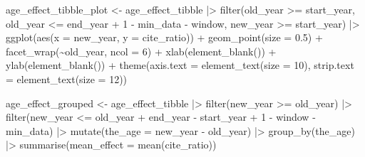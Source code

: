 \documentclass[
  10pt,
  letterpaper,
  DIV=11,
  numbers=noendperiod,
  twoside]{scrartcl}
\newenvironment{Shaded}{\begin{snugshade}}{\end{snugshade}}
\newcommand{\AttributeTok}[1]{\textcolor[rgb]{0.40,0.45,0.13}{#1}}
\newcommand{\DecValTok}[1]{\textcolor[rgb]{0.68,0.00,0.00}{#1}}
\newcommand{\FloatTok}[1]{\textcolor[rgb]{0.68,0.00,0.00}{#1}}
\newcommand{\FunctionTok}[1]{\textcolor[rgb]{0.28,0.35,0.67}{#1}}
\newcommand{\NormalTok}[1]{\textcolor[rgb]{0.00,0.23,0.31}{#1}}
\newcommand{\OtherTok}[1]{\textcolor[rgb]{0.00,0.23,0.31}{#1}}
\newcommand{\SpecialCharTok}[1]{\textcolor[rgb]{0.37,0.37,0.37}{#1}}
\begin{document}
\begin{Shaded}
\begin{Highlighting}[]
\NormalTok{age\_effect\_tibble\_plot }\OtherTok{\textless{}{-}}\NormalTok{ age\_effect\_tibble }\SpecialCharTok{|\textgreater{}}
  \FunctionTok{filter}\NormalTok{(old\_year }\SpecialCharTok{\textgreater{}=}\NormalTok{ start\_year, old\_year }\SpecialCharTok{\textless{}=}\NormalTok{ end\_year }\SpecialCharTok{+} \DecValTok{1} \SpecialCharTok{{-}}\NormalTok{ min\_data }\SpecialCharTok{{-}}\NormalTok{ window, new\_year }\SpecialCharTok{\textgreater{}=}\NormalTok{ start\_year) }\SpecialCharTok{|\textgreater{}}
  \FunctionTok{ggplot}\NormalTok{(}\FunctionTok{aes}\NormalTok{(}\AttributeTok{x =}\NormalTok{ new\_year, }\AttributeTok{y =}\NormalTok{ cite\_ratio)) }\SpecialCharTok{+}
  \FunctionTok{geom\_point}\NormalTok{(}\AttributeTok{size =} \FloatTok{0.5}\NormalTok{) }\SpecialCharTok{+}
  \FunctionTok{facet\_wrap}\NormalTok{(}\SpecialCharTok{\textasciitilde{}}\NormalTok{old\_year, }\AttributeTok{ncol =} \DecValTok{6}\NormalTok{) }\SpecialCharTok{+}
  \FunctionTok{xlab}\NormalTok{(}\FunctionTok{element\_blank}\NormalTok{()) }\SpecialCharTok{+}
  \FunctionTok{ylab}\NormalTok{(}\FunctionTok{element\_blank}\NormalTok{()) }\SpecialCharTok{+}
  \FunctionTok{theme}\NormalTok{(}\AttributeTok{axis.text =} \FunctionTok{element\_text}\NormalTok{(}\AttributeTok{size =} \DecValTok{10}\NormalTok{),}
        \AttributeTok{strip.text =} \FunctionTok{element\_text}\NormalTok{(}\AttributeTok{size =} \DecValTok{12}\NormalTok{))}

\NormalTok{age\_effect\_grouped }\OtherTok{\textless{}{-}}\NormalTok{ age\_effect\_tibble }\SpecialCharTok{|\textgreater{}}
  \FunctionTok{filter}\NormalTok{(new\_year }\SpecialCharTok{\textgreater{}=}\NormalTok{ old\_year) }\SpecialCharTok{|\textgreater{}}
  \FunctionTok{filter}\NormalTok{(new\_year }\SpecialCharTok{\textless{}=}\NormalTok{ old\_year }\SpecialCharTok{+}\NormalTok{ end\_year }\SpecialCharTok{{-}}\NormalTok{ start\_year }\SpecialCharTok{+} \DecValTok{1} \SpecialCharTok{{-}}\NormalTok{ window }\SpecialCharTok{{-}}\NormalTok{ min\_data) }\SpecialCharTok{|\textgreater{}}
  \FunctionTok{mutate}\NormalTok{(}\AttributeTok{the\_age =}\NormalTok{ new\_year }\SpecialCharTok{{-}}\NormalTok{ old\_year) }\SpecialCharTok{|\textgreater{}}
  \FunctionTok{group\_by}\NormalTok{(the\_age) }\SpecialCharTok{|\textgreater{}}
  \FunctionTok{summarise}\NormalTok{(}\AttributeTok{mean\_effect =} \FunctionTok{mean}\NormalTok{(cite\_ratio))}


\end{Highlighting}
\end{Shaded}
\end{document}
